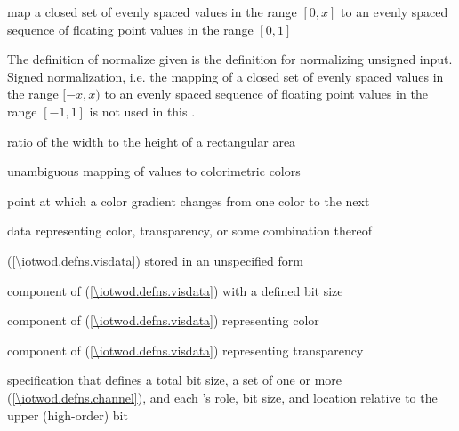 %
map a closed set of evenly spaced values in the range $[0, x]$ to an evenly spaced sequence of floating point values in the range $[0, 1]$
\begin{note}
The definition of normalize given is the definition for normalizing unsigned input. Signed normalization, i.e. the mapping of a closed set of evenly spaced values in the range $[-x, x)$ to an evenly spaced sequence of floating point values in the range $[-1, 1]$ is not used in this \documenttypename{}.
\end{note}

%
ratio of the width to the height of a rectangular area

%
unambiguous mapping of values to colorimetric colors

%
point at which a color gradient changes from one color to the next

%
data representing color, transparency, or some combination thereof

%
  (\ref{\iotwod.defns.visdata}) stored in an unspecified form

%
component of  (\ref{\iotwod.defns.visdata}) with a defined bit size

%
component of  (\ref{\iotwod.defns.visdata}) representing color

%
component of  (\ref{\iotwod.defns.visdata}) representing transparency

%
specification that defines a total bit size, a set of one or more  (\ref{\iotwod.defns.channel}), and each 's role, bit size, and location relative to the upper (high-order) bit

